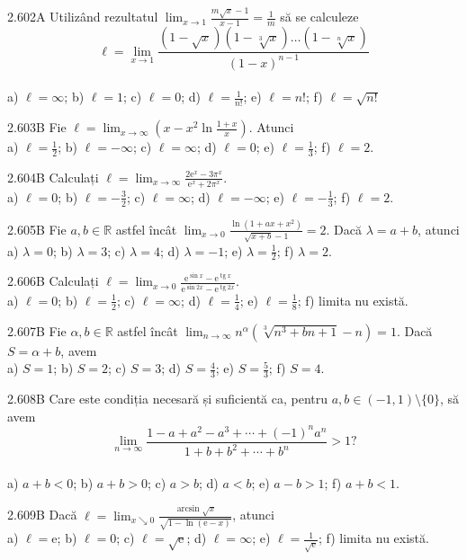 \documentclass[11pt]{article}
\begin{document}
2.602A Utilizând rezultatul $\lim _{x \rightarrow 1} \frac{m \sqrt{x}-1}{x-1}=\frac{1}{m}$ să se calculeze $$\ell=\lim _{x \rightarrow 1} \frac{(1-\sqrt{x})(1-\sqrt[3]{x}) \ldots(1-\sqrt[n]{x})}{(1-x)^{n-1}}$$\\ a) $\ell=\infty$; b) $\ell=1$; c) $\ell=0$; d) $\ell=\frac{1}{n!}$; e) $\ell=n!$; f) $\ell=\sqrt{n!}$

2.603B Fie $\ell=\lim _{x \rightarrow \infty}\left(x-x^{2} \ln \frac{1+x}{x}\right)$. Atunci\\ a) $\ell=\frac{1}{2}$; b) $\ell=-\infty$; c) $\ell=\infty$; d) $\ell=0$; e) $\ell=\frac{1}{3}$; f) $\ell=2$.

2.604B Calculați $\ell=\lim _{x \rightarrow \infty} \frac{2 \mathrm{e}^{x}-3 \pi^{x}}{\mathrm{e}^{x}+2 \pi^{x}}$.\\ a) $\ell=0$; b) $\ell=-\frac{3}{2}$; c) $\ell=\infty$; d) $\ell=-\infty$; e) $\ell=-\frac{1}{3}$; f) $\ell=2$.

2.605B Fie $a, b \in \mathbb{R}$ astfel încât $\lim _{x \rightarrow 0} \frac{\ln \left(1+a x+x^{2}\right)}{\sqrt{x+b}-1}=2$. Dacă $\lambda=a+b$, atunci\\ a) $\lambda=0$; b) $\lambda=3$; c) $\lambda=4$; d) $\lambda=-1$; e) $\lambda=\frac{1}{2}$; f) $\lambda=2$.

2.606B Calculați $\ell=\lim _{x \rightarrow 0} \frac{\mathrm{e}^{\sin x}-\mathrm{e}^{\operatorname{tg} x}}{\mathrm{e}^{\sin 2 x}-\mathrm{e}^{\operatorname{tg} 2 x}}$.\\ a) $\ell=0$; b) $\ell=\frac{1}{2}$; c) $\ell=\infty$; d) $\ell=\frac{1}{4}$; e) $\ell=\frac{1}{8}$; f) limita nu există.

2.607B Fie $\alpha, b \in \mathbb{R}$ astfel încât $\lim _{n \rightarrow \infty} n^{\alpha}\left(\sqrt[3]{n^{3}+b n+1}-n\right)=1$. Dacă $S=\alpha+b$, avem\\ a) $S=1$; b) $S=2$; c) $S=3$; d) $S=\frac{4}{3}$; e) $S=\frac{5}{3}$; f) $S=4$.

2.608B Care este condiția necesară și suficientă ca, pentru $a, b \in (-1,1) \setminus \{0\}$, să avem $$\lim _{n \rightarrow \infty} \frac{1-a+a^{2}-a^{3}+\cdots+(-1)^{n} a^{n}}{1+b+b^{2}+\cdots+b^{n}}>1 ?$$\\ a) $a+b<0$; b) $a+b>0$; c) $a>b$; d) $a<b$; e) $a-b>1$; f) $a+b<1$.

2.609B Dacă $\ell=\lim _{x \searrow 0} \frac{\arcsin \sqrt{x}}{\sqrt{1-\ln (\mathrm{e}-x)}}$, atunci\\ a) $\ell=\mathrm{e}$; b) $\ell=0$; c) $\ell=\sqrt{\mathrm{e}}$; d) $\ell=\infty$; e) $\ell=\frac{1}{\sqrt{\mathrm{e}}}$; f) limita nu există.
\end{document}
